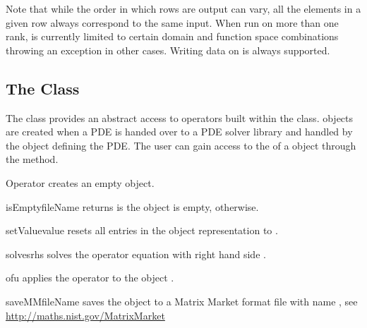 Note that while the order in which rows are output can vary, all the elements
in a given row always correspond to the same input.
When run on more than one \MPI rank,  is currently
limited to certain domain and function space combinations throwing an exception
in other cases. Writing data on \ContinuousFunction is always supported.

\subsection{The \Operator Class}
The \Operator class provides an abstract access to operators built
within the \LinearPDE class. \Operator objects are created
when a PDE is handed over to a PDE solver library and handled
by the \LinearPDE object defining the PDE. The user can gain access
to the \Operator of a \LinearPDE object through the 
method.

\begin{classdesc}{Operator}{}
creates an empty \Operator object.
\end{classdesc}

\begin{methoddesc}[Operator]{isEmpty}{fileName}
returns \True is the object is empty, \False otherwise.
\end{methoddesc}

\begin{methoddesc}[Operator]{setValue}{value}
resets all entries in the object representation to .
\end{methoddesc}

\begin{methoddesc}[Operator]{solves}{rhs}
solves the operator equation with right hand side .
\end{methoddesc}

\begin{methoddesc}[Operator]{of}{u}
applies the operator to the \Data object .
\end{methoddesc}

\begin{methoddesc}[Operator]{saveMM}{fileName}
saves the object to a Matrix Market format file with name , see
\url{http://maths.nist.gov/MatrixMarket}
\end{methoddesc}

